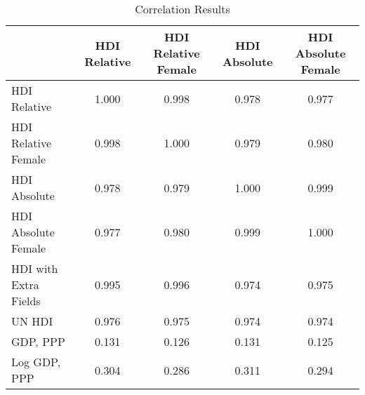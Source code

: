 \begin{table}
    \footnotesize
\caption{Correlation Results}
\begin{tabular}{lcccc}
\toprule
 & HDI Relative & HDI Relative Female & HDI Absolute & HDI Absolute Female \\
\midrule
HDI Relative & 1.000 & 0.998 & 0.978 & 0.977 \\
HDI Relative Female & 0.998 & 1.000 & 0.979 & 0.980 \\
HDI Absolute & 0.978 & 0.979 & 1.000 & 0.999 \\
HDI Absolute Female & 0.977 & 0.980 & 0.999 & 1.000 \\
HDI with Extra Fields & 0.995 & 0.996 & 0.974 & 0.975 \\
UN HDI & 0.976 & 0.975 & 0.974 & 0.974 \\
GDP, PPP & 0.131 & 0.126 & 0.131 & 0.125 \\
Log GDP, PPP & 0.304 & 0.286 & 0.311 & 0.294 \\
\bottomrule
\end{tabular}
\end{table}

